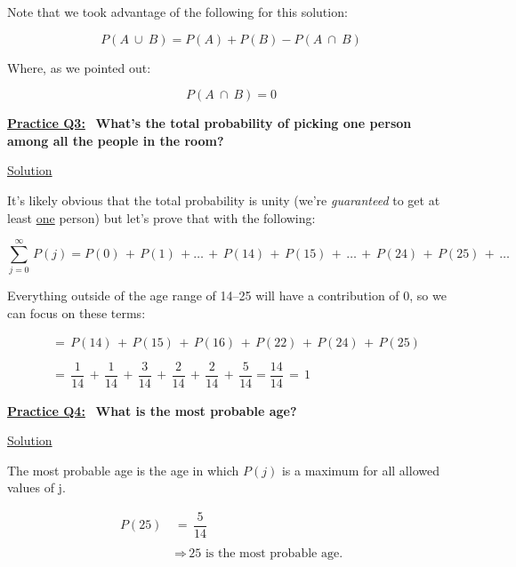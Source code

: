 Note that we took advantage of the following for this solution:

\[
    P(A \ \cup \ B) = P(A) + P(B) - P(A \ \cap \ B)
\]


Where, as we pointed out:

\[
    P(A \ \cap \ B) = 0
\]

\bigskip \bigskip

\underline{\textbf{Practice Q3:}} \ \textbf{What's the total probability of
picking one person among all the people in the room?}

\bigskip

\underline{Solution}

It's likely obvious that the total probability is unity (we're
\textit{guaranteed} to get at least \underline{one} person) but let's prove
that with the following:

\[
    \sum_{j=0}^{\infty} \, P(j) = P(0) \, + \, P(1) \, + \dots \, + \, P(14) \,
    + \, P(15) \, + \, \dots \, + \, P(24) \, + \, P(25) \, + \, \dots
\]

Everything outside of the age range of 14--25 will have a contribution of 0,
so we can focus on these terms:

\begin{align*}
    &= \, P(14) \, + \, P(15) \, + \, P(16) \, + \, P(22) \, + \, P(24) \, + \,
    P(25) \\ \\
    &= \, \dfrac{1}{14} \, + \, \dfrac{1}{14} \, + \, \dfrac{3}{14} \, + \,
    \dfrac{2}{14} \, + \, \dfrac{2}{14} \, + \, \dfrac{5}{14} = \dfrac{14}{14}
    \, = \, \boxed{1}
\end{align*}

\newpage

\underline{\textbf{Practice Q4:}} \ \textbf{What is the most probable age?}

\bigskip

\underline{Solution}

The most probable age is the age in which $P(j)$ is a maximum for all allowed
values of j.

\begin{align*}
    P(25) \, &= \, \dfrac{5}{14} \\ \\
    &\Rightarrow \, \boxed{\text{25 is the most probable age.}}
\end{align*}